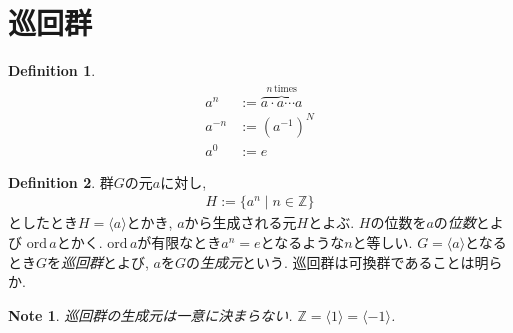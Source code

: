 \documentclass{article}
\theoremstyle{plain}
\theoremstyle{definition}
\newtheorem{definition}{Definition}
\theoremstyle{plain}
\newtheorem{note}{Note}
\numberwithin{equation}{section}
\numberwithin{theorem}{section}
\numberwithin{definition}{section}
\numberwithin{note}{section}
\begin{document}
\section{巡回群}
\begin{definition}
     \begin{align}
      a^n&:=\overbrace{a\cdot a\cdots a}^{n\,\mathrm{times}}\\
      a^{-n}&:=(a^{-1})^N\\
      a^0&:=e
     \end{align}
\end{definition}
\begin{definition}
     群$G$の元$a$に対し,
     \begin{align}
          H:=\lbrace a^n\mid n\in \mathbb{Z}\rbrace
     \end{align}
     としたとき$H=\langle a\rangle$とかき, $a$から生成される元$H$とよぶ. $H$の位数を$a$の\emph{位数}とよび $\mathrm{ord}\,a$とかく. $\mathrm{ord}\,a$が有限なとき$a^n=e$となるような$n$と等しい. $G=\langle a\rangle$となるとき$G$を\emph{巡回群}とよび, $a$を$G$の\emph{生成元}という. 巡回群は可換群であることは明らか.
\end{definition}
\begin{note}
     巡回群の生成元は一意に決まらない. $\mathbb{Z}=\langle 1\rangle=\langle-1\rangle$.
\end{note}
\end{document}
